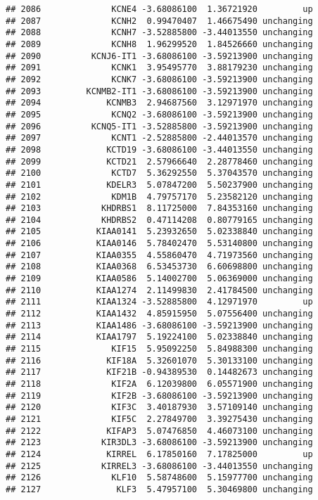 \documentclass[]{article}
\begin{document}
\begin{verbatim}
## 2086              KCNE4 -3.68086100  1.36721920         up
## 2087              KCNH2  0.99470407  1.46675490 unchanging
## 2088              KCNH7 -3.52885800 -3.44013550 unchanging
## 2089              KCNH8  1.96299520  1.84526660 unchanging
## 2090          KCNJ6-IT1 -3.68086100 -3.59213900 unchanging
## 2091              KCNK1  3.95495770  3.88179230 unchanging
## 2092              KCNK7 -3.68086100 -3.59213900 unchanging
## 2093         KCNMB2-IT1 -3.68086100 -3.59213900 unchanging
## 2094             KCNMB3  2.94687560  3.12971970 unchanging
## 2095              KCNQ2 -3.68086100 -3.59213900 unchanging
## 2096          KCNQ5-IT1 -3.52885800 -3.59213900 unchanging
## 2097              KCNT1 -2.52885800 -2.44013570 unchanging
## 2098             KCTD19 -3.68086100 -3.44013550 unchanging
## 2099             KCTD21  2.57966640  2.28778460 unchanging
## 2100              KCTD7  5.36292550  5.37043570 unchanging
## 2101             KDELR3  5.07847200  5.50237900 unchanging
## 2102              KDM1B  4.79757170  5.23582120 unchanging
## 2103            KHDRBS1  8.11725000  7.84353160 unchanging
## 2104            KHDRBS2  0.47114208  0.80779165 unchanging
## 2105           KIAA0141  5.23932650  5.02338840 unchanging
## 2106           KIAA0146  5.78402470  5.53140800 unchanging
## 2107           KIAA0355  4.55860470  4.71973560 unchanging
## 2108           KIAA0368  6.53453730  6.60698800 unchanging
## 2109           KIAA0586  5.14002700  5.06369000 unchanging
## 2110           KIAA1274  2.11499830  2.41784500 unchanging
## 2111           KIAA1324 -3.52885800  4.12971970         up
## 2112           KIAA1432  4.85915950  5.07556400 unchanging
## 2113           KIAA1486 -3.68086100 -3.59213900 unchanging
## 2114           KIAA1797  5.19224100  5.02338840 unchanging
## 2115              KIF15  5.95092250  5.84988300 unchanging
## 2116             KIF18A  5.32601070  5.30133100 unchanging
## 2117             KIF21B -0.94389530  0.14482673 unchanging
## 2118              KIF2A  6.12039800  6.05571900 unchanging
## 2119              KIF2B -3.68086100 -3.59213900 unchanging
## 2120              KIF3C  3.40187930  3.57109140 unchanging
## 2121              KIF5C  2.27849700  3.39275430 unchanging
## 2122             KIFAP3  5.07476850  4.46073100 unchanging
## 2123            KIR3DL3 -3.68086100 -3.59213900 unchanging
## 2124             KIRREL  6.17850160  7.17825000         up
## 2125            KIRREL3 -3.68086100 -3.44013550 unchanging
## 2126              KLF10  5.58748600  5.15977700 unchanging
## 2127               KLF3  5.47957100  5.30469800 unchanging

\end{verbatim}
\end{document}
